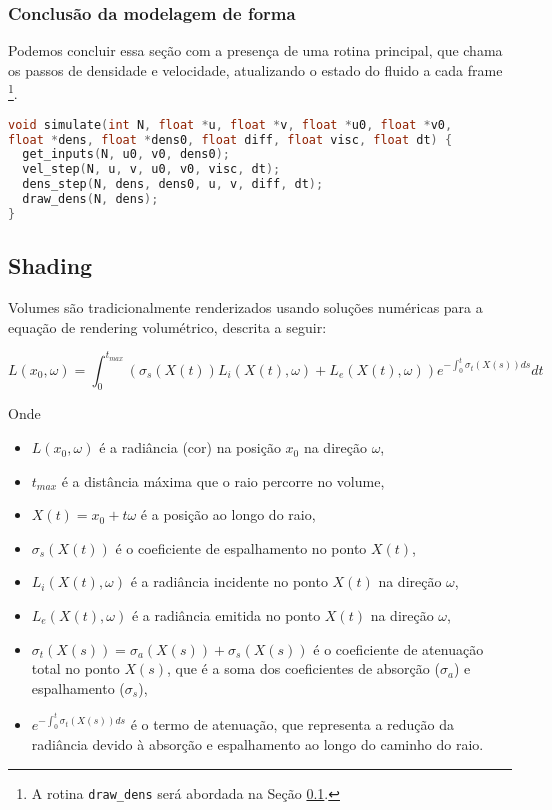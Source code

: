 \subsubsection{Conclusão da modelagem de forma}
Podemos concluir essa seção com a presença de uma rotina principal, que chama os passos de densidade e velocidade, atualizando o estado do fluido a cada frame \footnote{A rotina \texttt{draw\_dens} será abordada na Seção \ref{sec:shading}.}.
\begin{lstlisting}[language=C]
void simulate(int N, float *u, float *v, float *u0, float *v0,
float *dens, float *dens0, float diff, float visc, float dt) {
  get_inputs(N, u0, v0, dens0);
  vel_step(N, u, v, u0, v0, visc, dt);
  dens_step(N, dens, dens0, u, v, diff, dt);
  draw_dens(N, dens);
}
\end{lstlisting}

\subsection{Shading}
\label{sec:shading}

Volumes são tradicionalmente renderizados usando soluções numéricas para a equação de rendering volumétrico, descrita a seguir:

$$
L(x_0, \omega) = \int_{0}^{t_{max}} (\sigma_s(X(t)) L_i(X(t), \omega) + L_e(X(t), \omega))e^{-\int_{0}^{t} \sigma_t(X(s)) ds} dt
$$

Onde
\begin{itemize}
  \item $L(x_0, \omega)$ é a radiância (cor) na posição $x_0$ na direção $\omega$,
  \item $t_{max}$ é a distância máxima que o raio percorre no volume,
  \item $X(t) = x_0 + t\omega$ é a posição ao longo do raio,
  \item $\sigma_s(X(t))$ é o coeficiente de espalhamento no ponto $X(t)$,
  \item $L_i(X(t), \omega)$ é a radiância incidente no ponto $X(t)$ na direção $\omega$,
  \item $L_e(X(t), \omega)$ é a radiância emitida no ponto $X(t)$ na direção $\omega$,
  \item $\sigma_t(X(s)) = \sigma_a(X(s)) + \sigma_s(X(s))$ é o coeficiente de atenuação total no ponto $X(s)$, que é a soma dos coeficientes de absorção ($\sigma_a$) e espalhamento ($\sigma_s$),
  \item $e^{-\int_{0}^{t} \sigma_t(X(s)) ds}$ é o termo de atenuação, que representa a redução da radiância devido à absorção e espalhamento ao longo do caminho do raio.
\end{itemize}

